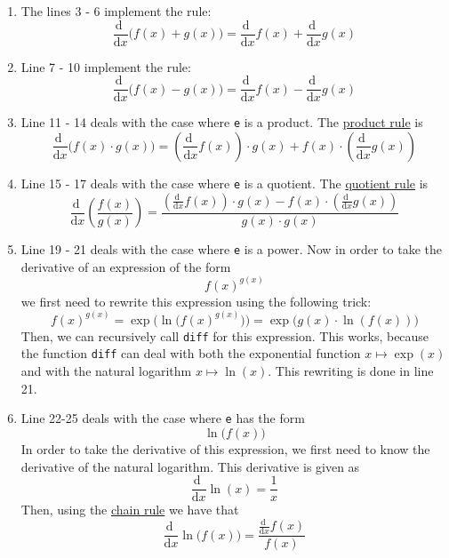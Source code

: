 \begin{enumerate}
\item The lines 3 - 6 implement the rule: 
      $$\frac{\mathrm{d}\;}{\mathrm{d}x}\bigl(f(x) + g(x)\bigr) = \frac{\mathrm{d}\;}{\mathrm{d}x} f(x) + \frac{\mathrm{d}\;}{\mathrm{d}x} g(x)$$
\item Line 7 - 10 implement the rule:
      $$\frac{\mathrm{d}\;}{\mathrm{d}x}\bigl(f(x) - g(x)\bigr) = \frac{\mathrm{d}\;}{\mathrm{d}x} f(x) - \frac{\mathrm{d}\;}{\mathrm{d}x} g(x)$$      
\item Line 11 - 14 deals with the case where \texttt{e} is a product.  The 
      \href{https://en.wikipedia.org/wiki/Product\_rule}{product rule} is      
      $$ \frac{\mathrm{d}\;}{\mathrm{d}x}\bigl(f(x) \cdot g(x)\bigr) = \left(\frac{\mathrm{d}\;}{\mathrm{d}x} f(x)\right)\cdot g(x) + f(x) \cdot \left(\frac{\mathrm{d}\;}{\mathrm{d}x} g(x)\right)
      $$
\item Line 15 - 17 deals with the case where \texttt{e} is a quotient.  The
      \href{https://en.wikipedia.org/wiki/Quotient\_rule}{quotient rule} is
      $$ \frac{\mathrm{d}\;}{\mathrm{d}x}\left(\frac{f(x)}{g(x)}\right) = 
         \frac{\displaystyle\left(\frac{\mathrm{d}\;}{\mathrm{d}x} f(x)\right)\cdot g(x) - 
         f(x) \cdot \left(\frac{\mathrm{d}\;}{\mathrm{d}x} g(x)\right)}{g(x) \cdot g(x)}
      $$      
\item Line 19 - 21 deals with the case where \texttt{e} is a power.  Now in order to take the derivative of an
      expression of the form
      $$  f(x)^{g(x)} $$
      we first need to rewrite this expression using the following trick:
      $$ f(x)^{g(x)} = \exp\bigl(\ln\bigl(f(x)^{g(x)}\bigr)\bigr) = \exp\bigl(g(x) \cdot \ln(f(x))\bigr) $$
      Then, we can recursively call \texttt{diff} for this expression.  This works, because the function
      \texttt{diff} can deal with both the exponential function $x \mapsto \exp(x)$ and with the natural
      logarithm $x \mapsto \ln(x)$.  This rewriting is done in line 21.      
\item Line 22-25 deals with the case where \texttt{e} has the form 
      $$\ln\bigl(f(x)\bigr)$$  
      In order to take the derivative of this expression, we first need to know the derivative of the natural
      logarithm.  This derivative is given as     
      $$ \frac{\mathrm{d}\;}{\mathrm{d}x} \ln(x) = \frac{1}{x}$$
      Then, using the \href{https://en.wikipedia.org/wiki/Chain\_rule}{chain rule} we have that
      $$ \frac{\mathrm{d}\;}{\mathrm{d}x} \ln\bigl(f(x)\bigr) = \frac{\frac{\mathrm{d}\;}{\mathrm{d}x} f(x)}{f(x)}$$     

\end{enumerate}
